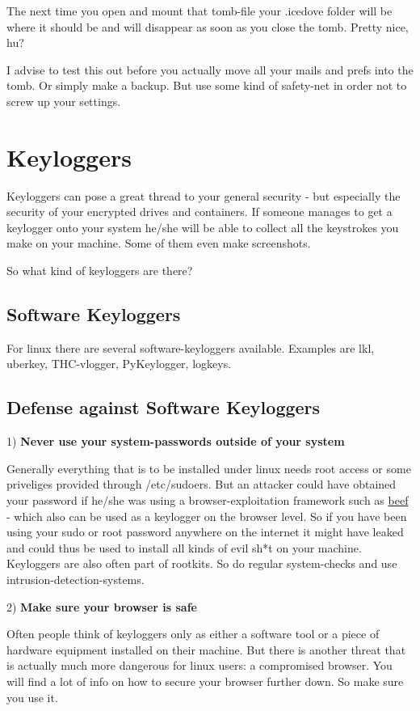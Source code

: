 \documentclass{article}
\begin{document}
 The next time you open and mount that tomb-file your .icedove folder will be where it should be and will disappear as soon as you close the tomb. Pretty nice, hu?


 I advise to test this out before you actually move all your mails and prefs into the tomb. Or simply make a backup. But use some kind of safety-net in order not to screw up your settings. 
\section{Keyloggers}


 Keyloggers can pose a great thread to your general security - but especially the security of your encrypted drives and containers. If someone manages to get a keylogger onto your system he/she will be able to collect all the keystrokes you make on your machine. Some of them even make screenshots.


 So what kind of keyloggers are there?
\subsection{Software Keyloggers}


 For linux there are several software-keyloggers available. Examples are lkl, uberkey, THC-vlogger, PyKeylogger, logkeys.
\subsection{Defense against Software Keyloggers}


 1) \textbf{Never use your system-passwords outside of your system}


 Generally everything that is to be installed under linux needs root access or some priveliges provided through /etc/sudoers. But an attacker could have obtained your password if he/she was using a browser-exploitation framework such as \href{http://beefproject.com/}{beef} - which also can be used as a keylogger on the browser level. So if you have been using your sudo or root password anywhere on the internet it might have leaked and could thus be used to install all kinds of evil sh*t on your machine. Keyloggers are also often part of rootkits. So do regular system-checks and use intrusion-detection-systems.


 2) \textbf{Make sure your browser is safe}


 Often people think of keyloggers only as either a software tool or a piece of hardware equipment installed on their machine. But there is another threat that is actually much more dangerous for linux users: a compromised browser. You will find a lot of info on how to secure your browser further down. So make sure you use it. 
\end{document}

